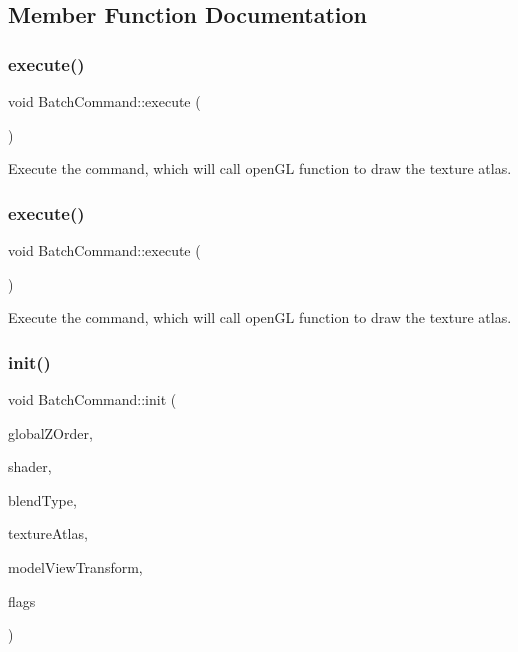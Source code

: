\subsection{Member Function Documentation}
\mbox{\label{classBatchCommand_a064c2181c57145a9c22d7293a1f1febf}} 
\subsubsection{\texorpdfstring{execute()}{execute()}\hspace{0.1cm}{\footnotesize\ttfamily [1/2]}}
{\footnotesize\ttfamily void Batch\+Command\+::execute (\begin{DoxyParamCaption}{ }\end{DoxyParamCaption})}

Execute the command, which will call open\+GL function to draw the texture atlas. \mbox{\label{classBatchCommand_a064c2181c57145a9c22d7293a1f1febf}} 
\subsubsection{\texorpdfstring{execute()}{execute()}\hspace{0.1cm}{\footnotesize\ttfamily [2/2]}}
{\footnotesize\ttfamily void Batch\+Command\+::execute (\begin{DoxyParamCaption}{ }\end{DoxyParamCaption})}

Execute the command, which will call open\+GL function to draw the texture atlas. \mbox{\label{classBatchCommand_a8e0fe35ceddb9f2a7001f659b9ce47c9}} 
\subsubsection{\texorpdfstring{init()}{init()}\hspace{0.1cm}{\footnotesize\ttfamily [1/2]}}
{\footnotesize\ttfamily void Batch\+Command\+::init (\begin{DoxyParamCaption}\item[{float}]{global\+Z\+Order,  }\item[{\hyperlink{classGLProgram}{G\+L\+Program} $\ast$}]{shader,  }\item[{\hyperlink{structBlendFunc}{Blend\+Func}}]{blend\+Type,  }\item[{\hyperlink{classTextureAtlas}{Texture\+Atlas} $\ast$}]{texture\+Atlas,  }\item[{const \hyperlink{classMat4}{Mat4} \&}]{model\+View\+Transform,  }\item[{uint32\+\_\+t}]{flags }\end{DoxyParamCaption})}

